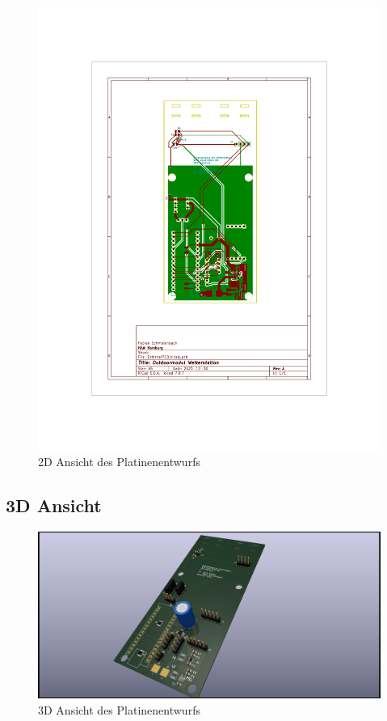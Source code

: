 \documentclass[a4paper,11pt]{article}
\begin{document}
\begin{figure}[H]
  \centering
  \includegraphics[scale=0.7, page=1]{PCBExtern.pdf}
  \caption{2D Ansicht des Platinenentwurfs}
  \label{pdf:platineExtern}
\end{figure}

\newpage
\subsection{3D Ansicht}

\begin{figure}[H]
  \centering
  \includegraphics[width=\textwidth]{ExternalPCB3D.jpg}
  \caption{3D Ansicht des Platinenentwurfs}
  \label{fig:platineExtern3D}
\end{figure}
\end{document}

